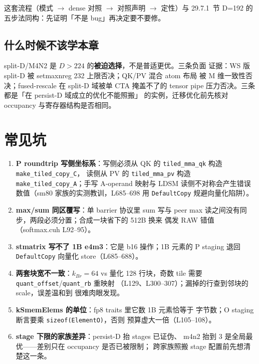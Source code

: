 这套流程（模式 $\to$ dense 对照 $\to$ 对照声明 $\to$ 定性）与
29.7.1~节 D=192 的五步法同构：先证明「不是 bug」再决定要不要修。

\subsection{什么时候不该学本章}

split-D/M4N2 是 $D>224$ 的\textbf{被迫选择}，不是普适更优。三条负面
证据：WS 版 split-D 被 setmaxnreg 232 上限否决；QK/PV 混合 atom 布局
被 M 维一致性否决；fused-rescale 在 split-D 域被单 CTA 掩盖不了的
tensor pipe 压力否决。三条都是「在 persist-D 域成立的优化不能照搬」
的实例，迁移优化前先核对 occupancy 与寄存器结构是否相同。

\section{常见坑}

\begin{enumerate}[itemsep=2pt,topsep=2pt]
  \item \textbf{P roundtrip 写侧坐标系}：写侧必须从 QK 的
        \texttt{tiled\_mma\_qk} 构造 \texttt{make\_tiled\_copy\_C}，
        读侧从 PV 的 \texttt{tiled\_mma\_pv} 构造
        \texttt{make\_tiled\_copy\_A}；手写 A-operand 映射与 LDSM
        读侧不对称会产生错误数值（sm80 家族的实测教训，L685--698 用
        \texttt{DefaultCopy} 规避向量化陷阱）。
  \item \textbf{max/sum 同区覆写}：单 barrier 协议里 sum 写与 peer
        max 读之间没有同步，两段必须分置；合成一块省下的 512B 换来
        偶发 RAW 错值（softmax.cuh L92--95）。
  \item \textbf{stmatrix 写不了 1B e4m3}：它是 b16 操作；1B 元素的
        P staging 退回 \texttt{DefaultCopy} 向量化 store（L685--688）。
  \item \textbf{两套块宽不一致}：$k_{Br}=64$ vs 量化 128 行块，奇数
        tile 需要 \texttt{quant\_offset}/\texttt{quant\_rb} 重映射
        （L129、L300--307）；漏掉的行查到邻块的 scale，误差温和到
        很难肉眼发现。
  \item \textbf{kSmemElems 的单位}：fp8 traits 里它数 1B 元素恰等于
        字节数；O staging 断言要乘 \texttt{sizeof(ElementO)}，否则
        预算虚大一倍（L105--108）。
  \item \textbf{stage 下限的家族差异}：persist-D 抬 stages 已证伪、
        m4n2 抬到 3 是全局最优——差别只在 occupancy 是否已被限制；
        跨家族照搬 stage 配置前先想清楚这一条。
\end{enumerate}

